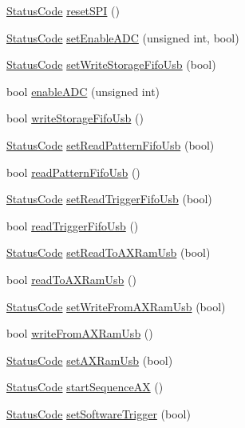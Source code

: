 \begin{DoxyCompactItemize}
\item 
\hyperlink{classStatusCode}{Status\+Code} \hyperlink{classA3PE_ae164123b49f8c4d1d119dbf201f0a839}{reset\+S\+PI} ()
\item 
\hyperlink{classStatusCode}{Status\+Code} \hyperlink{classA3PE_a0c90134c3440c8b8c8dc796c43893d64}{set\+Enable\+A\+DC} (unsigned int, bool)
\item 
\hyperlink{classStatusCode}{Status\+Code} \hyperlink{classA3PE_aa688f9dff8d2892464fcd13fdf3600ad}{set\+Write\+Storage\+Fifo\+Usb} (bool)
\item 
bool \hyperlink{classA3PE_a02608198bd28bc61882f27368fd90db1}{enable\+A\+DC} (unsigned int)
\item 
bool \hyperlink{classA3PE_af15048318a126074e28df1c6120d5e0d}{write\+Storage\+Fifo\+Usb} ()
\item 
\hyperlink{classStatusCode}{Status\+Code} \hyperlink{classA3PE_a9d3ba9807ea65be0af7f23ffa2372d6b}{set\+Read\+Pattern\+Fifo\+Usb} (bool)
\item 
bool \hyperlink{classA3PE_a3bb47f43f9f98d8a0d825aadc04e5ab6}{read\+Pattern\+Fifo\+Usb} ()
\item 
\hyperlink{classStatusCode}{Status\+Code} \hyperlink{classA3PE_a1d0dd1db3c493bc31aa56b55e7439e0e}{set\+Read\+Trigger\+Fifo\+Usb} (bool)
\item 
bool \hyperlink{classA3PE_a083315774486528a8b6c40e240fbf98f}{read\+Trigger\+Fifo\+Usb} ()
\item 
\hyperlink{classStatusCode}{Status\+Code} \hyperlink{classA3PE_a7ad649611d4cc5a7743db54aa3a4f943}{set\+Read\+To\+A\+X\+Ram\+Usb} (bool)
\item 
bool \hyperlink{classA3PE_af3152e461d446f442cfa7b69456ac276}{read\+To\+A\+X\+Ram\+Usb} ()
\item 
\hyperlink{classStatusCode}{Status\+Code} \hyperlink{classA3PE_aeb276fae7f19c45b4b4a3a5a2b99c337}{set\+Write\+From\+A\+X\+Ram\+Usb} (bool)
\item 
bool \hyperlink{classA3PE_a3b4333f547a2a36fc1f38bf4ca9afa89}{write\+From\+A\+X\+Ram\+Usb} ()
\item 
\hyperlink{classStatusCode}{Status\+Code} \hyperlink{classA3PE_a77ccfbd9df2fad96a9a9f1dc579a7a2d}{set\+A\+X\+Ram\+Usb} (bool)
\item 
\hyperlink{classStatusCode}{Status\+Code} \hyperlink{classA3PE_a91ae249ca14676f8b0832487955fcf8c}{start\+Sequence\+AX} ()
\item 
\hyperlink{classStatusCode}{Status\+Code} \hyperlink{classA3PE_aac0ee532f78885a25eebddbad501417f}{set\+Software\+Trigger} (bool)

\end{DoxyCompactItemize}
